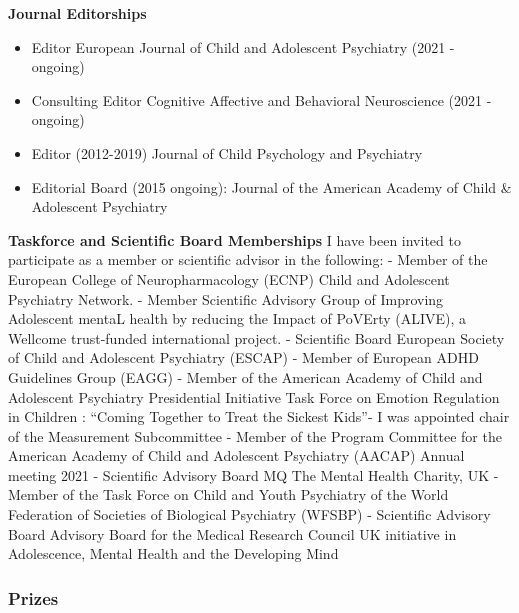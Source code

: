 \documentclass[
]{article}
\providecommand{\tightlist}{%
  \setlength{\itemsep}{0pt}\setlength{\parskip}{0pt}}
\begin{document}
\textbf{Journal Editorships}

\begin{itemize}
\tightlist
\item
  Editor European Journal of Child and Adolescent Psychiatry (2021 -
  ongoing)
\item
  Consulting Editor Cognitive Affective and Behavioral Neuroscience
  (2021 - ongoing)
\item
  Editor (2012-2019) Journal of Child Psychology and Psychiatry
\item
  Editorial Board (2015 ongoing): Journal of the American Academy of
  Child \& Adolescent Psychiatry
\end{itemize}

\textbf{Taskforce and Scientific Board Memberships} I have been invited
to participate as a member or scientific advisor in the following: -
Member of the European College of Neuropharmacology (ECNP) Child and
Adolescent Psychiatry Network. - Member Scientific Advisory Group of
Improving Adolescent mentaL health by reducing the Impact of PoVErty
(ALIVE), a Wellcome trust-funded international project. - Scientific
Board European Society of Child and Adolescent Psychiatry (ESCAP) -
Member of European ADHD Guidelines Group (EAGG) - Member of the American
Academy of Child and Adolescent Psychiatry Presidential Initiative Task
Force on Emotion Regulation in Children : ``Coming Together to Treat the
Sickest Kids''- I was appointed chair of the Measurement Subcommittee -
Member of the Program Committee for the American Academy of Child and
Adolescent Psychiatry (AACAP) Annual meeting 2021 - Scientific Advisory
Board MQ The Mental Health Charity, UK - Member of the Task Force on
Child and Youth Psychiatry of the World Federation of Societies of
Biological Psychiatry (WFSBP) - Scientific Advisory Board Advisory Board
for the Medical Research Council UK initiative in Adolescence, Mental
Health and the Developing Mind

\hypertarget{prizes}{%
\subsubsection{Prizes}\label{prizes}}
\end{document}
